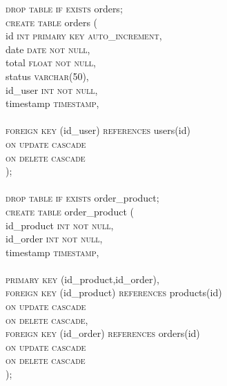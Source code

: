 \documentclass{article}
\begin{document}
\newpage

\textsc{\textcolor{sentence}{drop table if exists}} orders;\\
\textsc{\textcolor{sentence}{create table}} orders (\\
\phantom{abc} id \textsc{\textcolor{sentence}{int primary key auto\_increment}},\\
\phantom{abc} date \textsc{\textcolor{sentence}{date not null}},\\
\phantom{abc} total 
\textsc{\textcolor{sentence}{float not null}},\\
\phantom{abc} status \textsc{\textcolor{sentence}{varchar\textcolor{numberSQL}{(50)}}},\\
\phantom{abc} id\_user \textsc{\textcolor{sentence}{int not null}},\\
\phantom{abc} timestamp \textsc{\textcolor{sentence}{timestamp}},\\\\
\phantom{abc} \textsc{\textcolor{sentence}{foreign key}} (id\_user) \textsc{\textcolor{sentence}{references}} users(id)\\
\phantom{abc} \textsc{\textcolor{sentence}{on update cascade}}\\
\phantom{abc} \textsc{\textcolor{sentence}{on delete  cascade}}\\
);\\\\
\textsc{\textcolor{sentence}{drop table if exists}} order\_product;\\
\textsc{\textcolor{sentence}{create table}} order\_product (\\
\phantom{abc} id\_product \textsc{\textcolor{sentence}{int not null}},\\
\phantom{abc} id\_order \textsc{\textcolor{sentence}{int not null}},\\
\phantom{abc} timestamp \textsc{\textcolor{sentence}{timestamp}},\\\\
\phantom{abc} \textsc{\textcolor{sentence}{primary key}} (id\_product,id\_order),\\
\phantom{abc} \textsc{\textcolor{sentence}{foreign key}} (id\_product) \textsc{\textcolor{sentence}{references}} products(id)\\
\phantom{abc} \textsc{\textcolor{sentence}{on update cascade}}\\
\phantom{abc} \textsc{\textcolor{sentence}{on delete  cascade}},\\
\phantom{abc} \textsc{\textcolor{sentence}{foreign key}} (id\_order) \textsc{\textcolor{sentence}{references}} orders(id)\\
\phantom{abc} \textsc{\textcolor{sentence}{on update cascade}}\\
\phantom{abc} \textsc{\textcolor{sentence}{on delete  cascade}}\\
);
\end{document}
